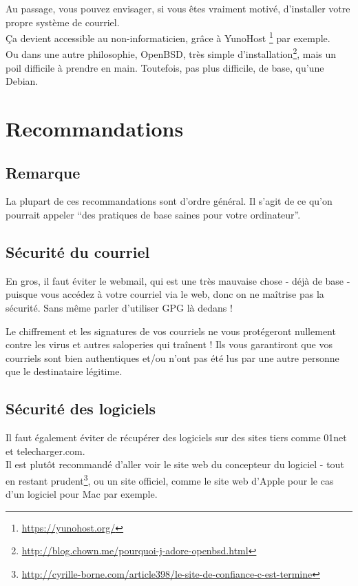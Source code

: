 Au passage, vous pouvez envisager, si vous êtes vraiment motivé,
d'installer votre propre système de courriel.\\Ça devient accessible au
non-informaticien, grâce à YunoHost \footnote{\url{https://yunohost.org/}} par
exemple.\\Ou dans une autre philosophie, OpenBSD, très simple
d'installation\footnote{\url{http://blog.chown.me/pourquoi-j-adore-openbsd.html}}, mais un poil difficile à prendre en main. Toutefois, pas plus difficile, de base, qu'une Debian.

\section{Recommandations}\label{recommandations}

\subsection{Remarque}
La plupart de ces recommandations sont d'ordre général. Il s'agit de ce
qu'on pourrait appeler ``des pratiques de base saines pour votre
ordinateur''.

\subsection{Sécurité du courriel}
En gros, il faut éviter le webmail, qui est une très mauvaise chose -
déjà de base - puisque vous accédez à votre courriel via le web, donc on
ne maîtrise pas la sécurité. Sans même parler d'utiliser GPG là dedans !

Le chiffrement et les signatures de vos courriels ne vous protégeront
nullement contre les virus et autres saloperies qui traînent ! Ils vous
garantiront que vos courriels sont bien authentiques et/ou n'ont pas été
lus par une autre personne que le destinataire légitime.

\subsection{Sécurité des logiciels}
Il faut également éviter de récupérer des logiciels sur des sites tiers
comme 01net et telecharger.com.\\Il est plutôt recommandé d'aller voir
le site web du concepteur du logiciel - tout en restant prudent\footnote{\url{http://cyrille-borne.com/article398/le-site-de-confiance-c-est-termine}}, ou un site officiel, comme le site web d'Apple pour le cas d'un logiciel pour Mac
par exemple.

